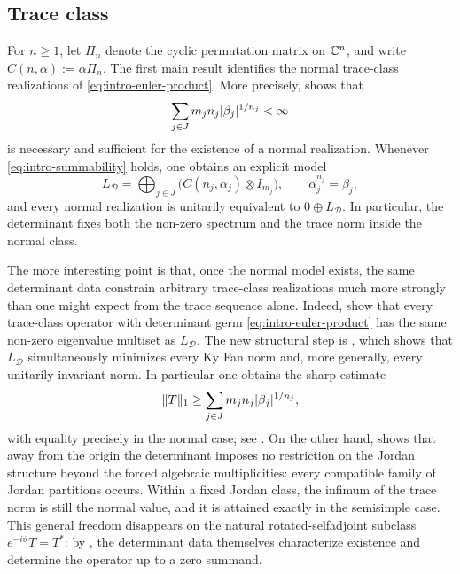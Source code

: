 \subsection{Trace class}

For \(n\ge 1\), let \(\Pi_n\) denote the cyclic permutation matrix on
\(\mathbb{C}^n\), and write \(C(n,\alpha):=\alpha\Pi_n\). The first main result
identifies the normal trace-class realizations of
\eqref{eq:intro-euler-product}. More precisely,
 shows that
\begin{equation}\label{eq:intro-summability}
  \sum_{j\in J}m_j n_j\lvert \beta_j \rvert^{1/n_j}<\infty
\end{equation}
is necessary and sufficient for the existence of a normal realization.
Whenever \eqref{eq:intro-summability} holds, one obtains an explicit
model
\[
  L_{\mathcal D}
  =\bigoplus_{j\in J}\bigl(C(n_j,\alpha_j)\otimes I_{m_j}\bigr),
  \qquad
  \alpha_j^{n_j}=\beta_j,
\]
and every normal realization is unitarily equivalent to
\(0\oplus L_{\mathcal D}\). In particular, the determinant fixes both
the non-zero spectrum and the trace norm inside the normal class.

The more interesting point is that, once the normal model exists, the
same determinant data constrain arbitrary trace-class realizations much
more strongly than one might expect from the trace sequence alone.
Indeed, 
show that every trace-class operator with determinant germ
\eqref{eq:intro-euler-product} has the same non-zero eigenvalue multiset
as \(L_{\mathcal D}\). The new structural step is
, which shows that \(L_{\mathcal D}\)
simultaneously minimizes every Ky Fan norm and, more generally, every
unitarily invariant norm. In particular one obtains the sharp estimate
\[
  \|T\|_1\ge \sum_{j\in J}m_j n_j\lvert \beta_j \rvert^{1/n_j},
\]
with equality precisely in the normal case; see
. On the other hand,
 shows that away from the
origin the determinant imposes no restriction on the Jordan structure
beyond the forced algebraic multiplicities: every compatible family of
Jordan partitions occurs. Within a fixed Jordan class, the infimum of
the trace norm is still the normal value, and it is attained exactly in
the semisimple case. This general freedom disappears on the natural
rotated-selfadjoint subclass \(e^{-i\vartheta}T=T^*\): by
, the determinant data themselves
characterize existence and determine the operator up to a zero summand.

